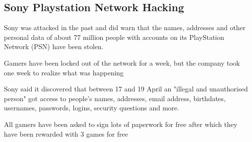 \documentclass[a4paper,12pt]{article}
\begin{document}
\subsection{Sony Playstation Network Hacking}

Sony was attacked in the past and did warn that the names, addresses and other personal data of about 77 million people with accounts on its PlayStation Network (PSN) have been stolen.

Gamers have been locked out of the network for a week, but the company took one week to realize what was happening

Sony said it discovered that between 17 and 19 April an "illegal and unauthorised person" got access to people's names, addresses, email address, birthdates, usernames, passwords, logins, security questions and more.

All gamers have been asked to sign lots of paperwork for free after which they have been rewarded with 3 games for free
\end{document}
